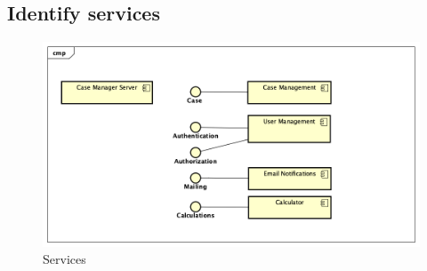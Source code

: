 \newpage
\subsection{Identify services}
\begin{figure}[htb!]
    \centering
    \includegraphics[width=\textwidth]{img/cmp-services.png}
    \caption{Services}
\end{figure}
